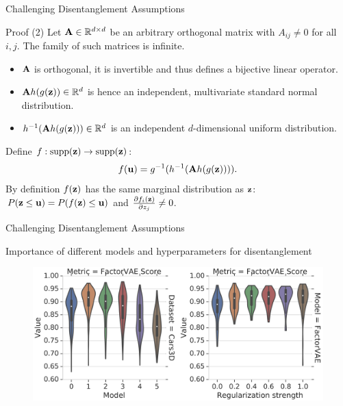 \begin{frame}{Challenging Disentanglement Assumptions}
\begin{block}{Proof (2)}
	Let $\mathbf{A} \in \mathbb{R}^{d \times d}$ be an arbitrary orthogonal matrix with $A_{ij} \neq 0$ for all $i, j$.
	The family of such matrices is infinite.
	\begin{itemize}
		\item $\mathbf{A}$ is orthogonal, it is invertible and thus defines a bijective linear operator. 
		\item $\mathbf{A} h(g(\mathbf{z})) \in \mathbb{R}^d$ is hence an independent, multivariate standard normal distribution.
		\item $h^{-1}( \mathbf{A} h(g(\mathbf{z}))) \in \mathbb{R}^d$ is an independent $d$-dimensional uniform distribution.
	\end{itemize}
	Define $f: \text{supp}(\mathbf{z}) \rightarrow \text{supp}(\mathbf{z})$:
	\vspace{-0.2cm}
	\[
	f(\mathbf{u}) = g^{-1} (h^{-1}( \mathbf{A} h(g(\mathbf{z})))).
	\]
	By definition $f(\mathbf{z})$ has the same marginal distribution as $\mathbf{z}$: $P(\mathbf{z} \leq \mathbf{u}) = P(f(\mathbf{z}) \leq \mathbf{u})$ and $\frac{\partial f_i(\mathbf{z})}{\partial z_j} \neq 0$.
\end{block}

\end{frame}
\begin{frame}{Challenging Disentanglement Assumptions}
\begin{block}{Importance of different models and hyperparameters for disentanglement}
	\begin{figure}
		\centering
		\includegraphics[width=\linewidth]{figs/challenge_dis_2}
	\end{figure}
\end{block}

\end{frame}
